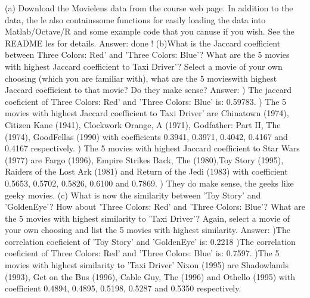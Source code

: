\documentclass[paper=a4, fontsize=11pt]{scrartcl} %
\numberwithin{equation}{section} %
\numberwithin{figure}{section} %
\numberwithin{table}{section} %
\begin{document}
(a) Download the Movielens data from the course web page. In addition to the data, the le also containssome functions for easily loading the data into Matlab/Octave/R and some example code that you canuse if you wish. See the README les for details.
\newline
\newline
Answer:
\newline
done !
\newline
\newline
(b)What is the Jaccard coefficient between Three Colors: Red' and 'Three Colors: Blue'? What are the 5 movies with highest Jaccard coefficient to Taxi Driver'? Select a movie of your own choosing (which you are familiar with), what are the 5 movieswith highest Jaccard coefficient to that movie? Do they make sense?
\newline
\newline
Answer:
) The jaccard coeficient of Three Colors: Red' and 'Three Colors: Blue' is: 0.59783. 
) The 5 movies with highest Jaccard coefficient to Taxi Driver' are Chinatown (1974), Citizen Kane (1941), Clockwork Orange, A (1971), Godfather: Part II, The (1974), GoodFellas (1990) with coefficients 0.3941, 0.3971, 0.4042, 0.4167 and 0.4167 respectively. 
)  The 5 movies with highest Jaccard coefficient to Star Wars (1977) are Fargo (1996), Empire Strikes Back, The (1980),Toy Story (1995), Raiders of the Lost Ark (1981) and Return of the Jedi (1983) with coefficient  0.5653, 0.5702, 0.5826, 0.6100 and 0.7869. 
) They do make sense, the geeks like geeky movies.
\newline
\newline
(c) What is now the similarity between 'Toy Story' and 'GoldenEye'? How about 'Three Colors: Red' and 'Three Colors: Blue'? What are the 5 movies with highest similarity to 'Taxi Driver'? Again, select a movie of your own choosing and list the 5 movies with highest similarity.
\newline
\newline
Answer:
)The correlation coeficient of 'Toy Story' and 'GoldenEye' is: 0.2218  
)The correlation coeficient of Three Colors: Red' and 'Three Colors: Blue' is: 0.7597. 
)The 5 movies with highest similarity to 'Taxi Driver' Nixon (1995) are Shadowlands (1993), Get on the Bus (1996), Cable Guy, The (1996) and Othello (1995) with coefficient  0.4894, 0.4895, 0.5198, 0.5287 and 0.5350 respectively. 
\end{document}
